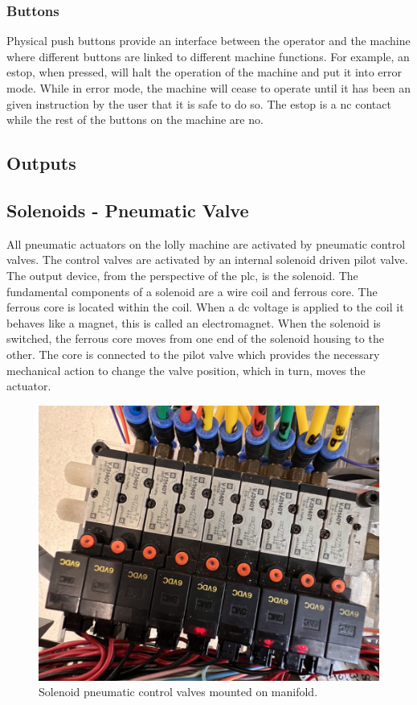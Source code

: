     \subsubsection{Buttons}
    Physical push buttons provide an interface between the operator and the machine where different buttons are linked to different machine functions. For example, an \acrfull{estop}, when pressed, will halt the operation of the machine and put it into error mode. While in error mode, the machine will cease to operate until it has been an given instruction by the user that it is safe to do so. The \acrshort{estop} is a \acrshort{nc} contact while the rest of the buttons on the machine are \acrshort{no}.
    
\subsection{Outputs}
    \subsection{Solenoids - Pneumatic Valve}
    All pneumatic actuators on the lolly machine are activated by pneumatic control valves. The control valves are activated by an internal solenoid driven pilot valve.  The output device, from the perspective of the \acrshort{plc}, is the solenoid. The fundamental components of a solenoid are a wire coil and ferrous core. The ferrous core is located within the coil. When a \acrshort{dc} voltage is applied to the coil it behaves like a magnet, this is called an electromagnet. When the solenoid is switched, the ferrous core moves from one end of the solenoid housing to the other. The core is connected to the pilot valve which provides the necessary mechanical action to change the valve position, which in turn, moves the actuator. 
    
        \begin{figure}[H]
            \centering
            \includegraphics[scale = 0.5]{2_images/controlValvesPic.png}
            \caption{Solenoid pneumatic control valves mounted on manifold.}
            \label{fig:controlValvesPic}
        \end{figure} 
    \newpage
